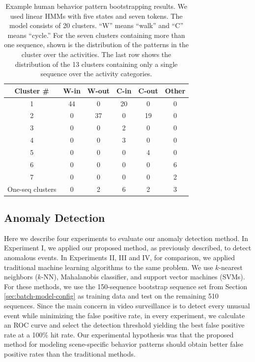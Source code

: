 \begin{table}[t]
  \caption[Example human behavior pattern bootstrapping
    results.]{\small Example human behavior pattern bootstrapping
    results. We used linear HMMs with five states and seven
    tokens. The model consists of 20 clusters. ``W'' means ``walk''
    and ``C'' means ``cycle.''  For the seven clusters containing more
    than one sequence, shown is the distribution of the patterns in
    the cluster over the activities.  The last row shows the
    distribution of the 13 clusters containing only a single sequence
    over the activity categories.}
  \begin{center}
    \begin{tabular}{c|c|c|c|c|c}
      \hline
      Cluster \# & W-in & W-out & C-in & C-out & Other \\
      \hline \hline
      1 & 44 & 0 & 20 & 0 & 0 \\ \hline
      2 & 0 & 37 & 0 & 19 & 0 \\ \hline
      3 & 0 & 0 & 2 & 0 & 0 \\ \hline
      4 & 0 & 0 & 3 & 0 & 0 \\ \hline
      5 & 0 & 0 & 0 & 4 & 0 \\ \hline
      6 & 0 & 0 & 0 & 0 & 6 \\ \hline
      7 & 0 & 0 & 0 & 0 & 2 \\ \hline
      One-seq clusters & 0 & 2 & 6 & 2 & 3 \\ \hline
    \end{tabular}
  \end{center}
  \label{tab:batch-bootstrapping-results}
\end{table}

\subsection{Anomaly Detection}

Here we describe four experiments to evaluate our anomaly detection
method. In Experiment I, we applied our proposed method, as previously
described, to detect anomalous events. In Experiments II, III and IV,
for comparison, we applied traditional machine learning algorithms to
the same problem. We use $k$-nearest neighbors ($k$-NN), Mahalanobis 
classifier, and support vector machines (SVMs).  For
these methods, we use the 150-sequence bootstrap sequence set from
Section \ref{sec:batch-model-config} as training data and test on the
remaining 510 sequences.  Since the main concern in video surveillance
is to detect every unusual event while minimizing the false positive
rate, in every experiment, we calculate an ROC curve and select the
detection threshold yielding the best false positive rate at a 100\%
hit rate. Our experimental hypothesis was that the proposed method for
modeling scene-specific behavior patterns should obtain better false
positive rates than the traditional methods.

